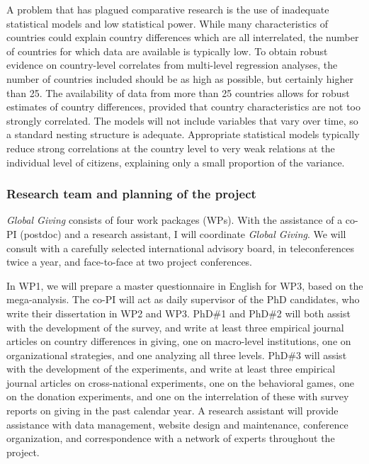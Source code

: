 \documentclass[twocolumn, serif, rga, numeric]{jote-article}
\begin{document}
A problem that has plagued comparative research is the use of inadequate statistical models and low statistical power.\cite{Bekkers2016}
While many characteristics of countries could explain country differences which are all interrelated, the number of countries for which data are available is typically low. To obtain robust evidence on country-level correlates from multi-level regression analyses, the number of countries included should be as high as possible, but certainly higher than 25.\cite{Bryan} The availability of data from more than 25 countries allows for robust estimates of country differences, provided that country characteristics are not too strongly correlated. The models will not include variables that vary over time, so a standard nesting structure is adequate.\cite{Schmidt-Catran2016}
Appropriate statistical models typically reduce strong correlations at the country level to very weak relations at the individual level of citizens, explaining only a small proportion of the variance.\cite{CAF20Bekkers2016, Bekkers2016, Gesthuizen2008}

 {}\subsubsection*{Research team and planning of the project} 

\emph{Global Giving} consists of four work packages (WPs). With the assistance of a co-PI (postdoc) and a research assistant, I will coordinate \emph{Global Giving}. We will consult with a carefully selected international advisory board, in teleconferences twice a year, and face-to-face at two project conferences.

In WP1, we will prepare a master questionnaire in English for WP3, based on the mega-analysis. The co-PI will act as daily supervisor of the PhD candidates, who write their dissertation in WP2 and WP3. PhD\#1 and PhD\#2 will both assist with the development of the survey, and write at least three empirical journal articles on country differences in giving, one on macro-level institutions, one on organizational strategies, and one analyzing all three levels. PhD\#3 will assist with the development of the experiments, and write at least three empirical journal articles on cross-national experiments, one on the behavioral games, one on the donation experiments, and one on the interrelation of these with survey reports on giving in the past calendar year. A research assistant will provide assistance with data management, website design and maintenance, conference organization, and correspondence with a network of experts throughout the project.
\end{document}
